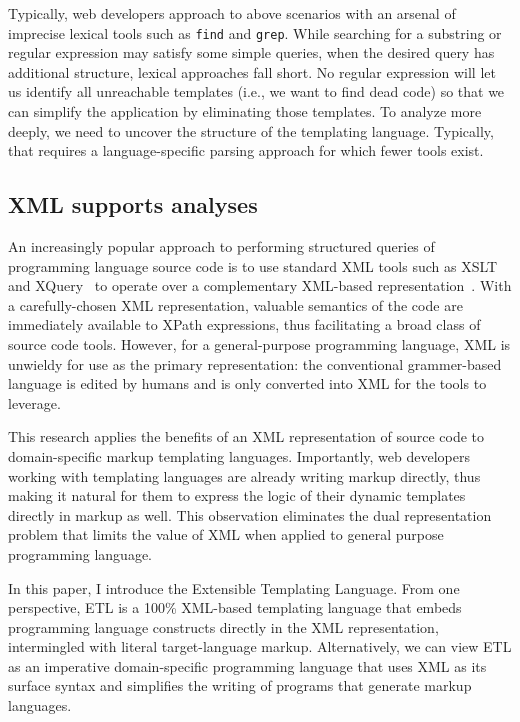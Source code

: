 \documentclass{www2003-submission}
\newcommand{\smtexttt}[1]{{\small\texttt{#1}}}
\begin{document}
Typically, web developers approach to above scenarios with an arsenal
of imprecise lexical tools such as \smtexttt{find} and
\smtexttt{grep}.  While searching for a substring or regular
expression may satisfy some simple queries, when the desired query has
additional structure, lexical approaches fall short.  No regular
expression will let us identify all unreachable templates (i.e., we
want to find dead code) so that we can simplify the application by
eliminating those templates.  To analyze more deeply, we need to
uncover the structure of the templating language.  Typically, that
requires a language-specific parsing approach for which fewer tools
exist.

\subsection{XML supports analyses}

An increasingly popular approach to performing structured queries of
programming language source code is to use standard XML tools such as
XSLT~\cite{XSLT} and XQuery~\cite{XQuery} to operate over a
complementary XML-based representation~\cite{JavaML,others}.  With a
carefully-chosen XML representation, valuable semantics of the code
are immediately available to XPath expressions, thus facilitating a
broad class of source code tools.  However, for a general-purpose
programming language, XML is unwieldy for use as the primary
representation: the conventional grammer-based language is edited by
humans and is only converted into XML for the tools to leverage.

This research applies the benefits of an XML representation of source
code to domain-specific markup templating languages.  Importantly,
web developers working with templating languages are already writing
markup directly, thus making it natural for them to express the logic
of their dynamic templates directly in markup as well.  This
observation eliminates the dual representation problem that limits the
value of XML when applied to general purpose programming language.

In this paper, I introduce the Extensible Templating Language.  From
one perspective, ETL is a 100\% XML-based templating language that
embeds programming language constructs directly in the XML
representation, intermingled with literal target-language markup.
Alternatively, we can view ETL as an imperative domain-specific
programming language that uses XML as its surface syntax and
simplifies the writing of programs that generate markup languages.
\end{document}
